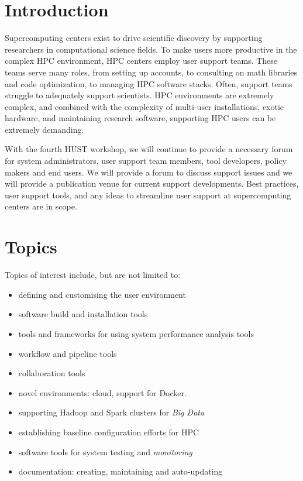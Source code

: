 \documentclass[11pt,a4paper]{article}
\begin{document}
\setcounter{page}{2}

\parindent 0pt
\parskip 6pt
\pagebreak
\section{Introduction}

Supercomputing centers exist to drive scientific discovery by supporting researchers in 
computational science fields.  To make users more productive in the complex HPC
environment, HPC centers employ user support teams.  These teams
serve many roles, from setting up accounts, to consulting on math libraries and code
optimization, to managing HPC software stacks.
Often, support teams struggle to adequately support scientists.
HPC environments are extremely complex, and combined with
the complexity of multi-user installations, exotic hardware, and maintaining
research software, supporting HPC users can be extremely demanding.

With the fourth HUST workshop, we will continue to provide a necessary forum for 
system administrators, user support team members, tool developers, policy makers and
end users.  We will provide a forum to discuss support issues and we will
provide a publication venue for current support developments.  Best practices,
user support tools, and any ideas to streamline user support at supercomputing
centers are in scope.

\section{Topics}

Topics of interest include, but are not limited to:

\begin{itemize}
\item defining and customising the user environment
\item software build and installation tools
\item tools and frameworks for using system performance analysis tools
\item workflow and pipeline tools
\item collaboration tools
\item novel environments: cloud, support for Docker.
\item supporting Hadoop and Spark clusters for \emph{Big Data}
\item establishing baseline configuration efforts for HPC
\item software tools for system testing and \emph{monitoring}
\item documentation: creating, maintaining and auto-updating
\end{itemize}
\end{document}
